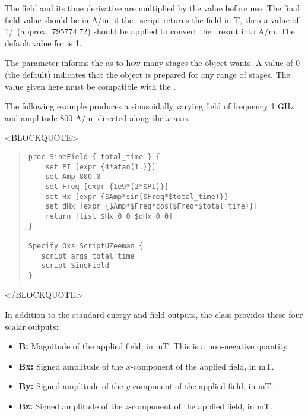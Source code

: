 \begin{description}
   The field and its time derivative are multiplied by the
    value before use.  The final field value should
   be in A/m; if the \Tcl\ script returns the field in T, then a
    value of 1/\munaught\ (approx.\ 795774.72) should be
   applied to convert the \Tcl\ result into A/m.  The default value for
    is 1.

   The  parameter informs the
    as to how many stages the
    object wants.  A value of 0 (the default)
   indicates that the object is prepared for any range of stages.  The
    value given here must be compatible with the
   .


   The following example produces a sinusoidally varying field of
   frequency 1 GHz and amplitude 800 A/m, directed along the $x$-axis.
\begin{rawhtml}
<BLOCKQUOTE>
\end{rawhtml}
\begin{quote}
\begin{verbatim}
proc SineField { total_time } {
    set PI [expr {4*atan(1.)}]
    set Amp 800.0
    set Freq [expr {1e9*(2*$PI)}]
    set Hx [expr {$Amp*sin($Freq*$total_time)}]
    set dHx [expr {$Amp*$Freq*cos($Freq*$total_time)}]
    return [list $Hx 0 0 $dHx 0 0]
}

Specify Oxs_ScriptUZeeman {
   script_args total_time
   script SineField
}
\end{verbatim}
\end{quote}
\begin{rawhtml}
</BLOCKQUOTE>
\end{rawhtml}

   In addition to the standard energy and field outputs, the
    class provides these four scalar outputs:
   \begin{itemize}
   \item \textbf{B:} Magnitude of the applied field, in
   mT.  This is a non-negative quantity.
   \item \textbf{Bx:} Signed amplitude of the $x$-component
   of the applied field, in mT.
   \item \textbf{By:} Signed amplitude of the $y$-component
   of the applied field, in mT.
   \item \textbf{Bz:} Signed amplitude of the $z$-component
   of the applied field, in mT.
   \end{itemize}


\end{description}
